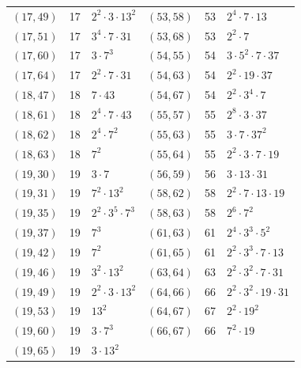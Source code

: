 \documentclass[11pt]{article}
\begin{document}
\begin{longtable}{@{}lrl@{\qquad}lrl@{}}
$(17,49)$ & 17 & $2^{2}\cdot 3\cdot 13^{2}$ & $(53,58)$ & 53 & $2^{4}\cdot 7\cdot 13$\\
$(17,51)$ & 17 & $3^{4}\cdot 7\cdot 31$ & $(53,68)$ & 53 & $2^{2}\cdot 7$\\
$(17,60)$ & 17 & $3\cdot 7^{3}$ & $(54,55)$ & 54 & $3\cdot 5^{2}\cdot 7\cdot 37$\\
$(17,64)$ & 17 & $2^{2}\cdot 7\cdot 31$ & $(54,63)$ & 54 & $2^{2}\cdot 19\cdot 37$\\
$(18,47)$ & 18 & $7\cdot 43$ & $(54,67)$ & 54 & $2^{2}\cdot 3^{4}\cdot 7$\\
$(18,61)$ & 18 & $2^{4}\cdot 7\cdot 43$ & $(55,57)$ & 55 & $2^{8}\cdot 3\cdot 37$\\
$(18,62)$ & 18 & $2^{4}\cdot 7^{2}$ & $(55,63)$ & 55 & $3\cdot 7\cdot 37^{2}$\\
$(18,63)$ & 18 & $7^{2}$ & $(55,64)$ & 55 & $2^{2}\cdot 3\cdot 7\cdot 19$\\
$(19,30)$ & 19 & $3\cdot 7$ & $(56,59)$ & 56 & $3\cdot 13\cdot 31$\\
$(19,31)$ & 19 & $7^{2}\cdot 13^{2}$ & $(58,62)$ & 58 & $2^{2}\cdot 7\cdot 13\cdot 19$\\
$(19,35)$ & 19 & $2^{2}\cdot 3^{5}\cdot 7^{3}$ & $(58,63)$ & 58 & $2^{6}\cdot 7^{2}$\\
$(19,37)$ & 19 & $7^{3}$ & $(61,63)$ & 61 & $2^{4}\cdot 3^{3}\cdot 5^{2}$\\
$(19,42)$ & 19 & $7^{2}$ & $(61,65)$ & 61 & $2^{2}\cdot 3^{3}\cdot 7\cdot 13$\\
$(19,46)$ & 19 & $3^{2}\cdot 13^{2}$ & $(63,64)$ & 63 & $2^{2}\cdot 3^{2}\cdot 7\cdot 31$\\
$(19,49)$ & 19 & $2^{2}\cdot 3\cdot 13^{2}$ & $(64,66)$ & 66 & $2^{2}\cdot 3^{2}\cdot 19\cdot 31$\\
$(19,53)$ & 19 & $13^{2}$ & $(64,67)$ & 67 & $2^{2}\cdot 19^{2}$\\
$(19,60)$ & 19 & $3\cdot 7^{3}$ & $(66,67)$ & 66 & $7^{2}\cdot 19$\\
$(19,65)$ & 19 & $3\cdot 13^{2}$ & & &\\
\end{longtable}
\endgroup
\end{document}
